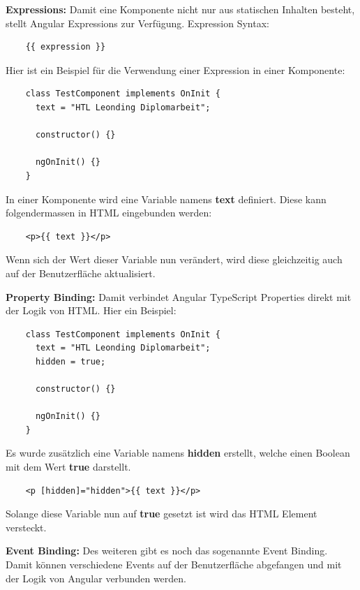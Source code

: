 \textbf{Expressions:}
\newline
Damit eine Komponente nicht nur aus statischen Inhalten besteht, stellt Angular Expressions zur Verfügung.
Expression Syntax:

\begin{lstlisting}
    {{ expression }}
\end{lstlisting}

Hier ist ein Beispiel für die Verwendung einer Expression in einer Komponente:

\begin{lstlisting}
    class TestComponent implements OnInit {
      text = "HTL Leonding Diplomarbeit";
    
      constructor() {}
    
      ngOnInit() {}
    }
\end{lstlisting}

In einer Komponente wird eine Variable namens \textbf{text} definiert. Diese kann folgendermassen in HTML eingebunden werden:

\begin{lstlisting}
    <p>{{ text }}</p>
\end{lstlisting}

Wenn sich der Wert dieser Variable nun verändert, wird diese gleichzeitig auch auf der Benutzerfläche aktualisiert. 

\textbf{Property Binding:}
\newline
Damit verbindet Angular TypeScript Properties direkt mit der Logik von HTML. Hier ein Beispiel:

\begin{lstlisting}
    class TestComponent implements OnInit {
      text = "HTL Leonding Diplomarbeit";
      hidden = true;
    
      constructor() {}
    
      ngOnInit() {}
    }
\end{lstlisting}

Es wurde zusätzlich eine Variable namens \textbf{hidden} erstellt, welche einen Boolean mit dem Wert \textbf{true} darstellt.

\begin{lstlisting}
    <p [hidden]="hidden">{{ text }}</p>
\end{lstlisting}

Solange diese Variable nun auf \textbf{true} gesetzt ist wird das HTML Element versteckt.

\textbf{Event Binding:}
\newline
Des weiteren gibt es noch das sogenannte Event Binding. Damit können verschiedene Events auf der Benutzerfläche abgefangen und mit der Logik von Angular verbunden werden.

